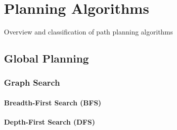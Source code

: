 \chapter{Planning Algorithms}\label{ch:planningalgorithms}
Overview and classification of path planning algorithms
\section{Global Planning}\label{sec:global}
\subsection{Graph Search}
\subsubsection{Breadth-First Search (BFS)}
\subsubsection{Depth-First Search (DFS)}
